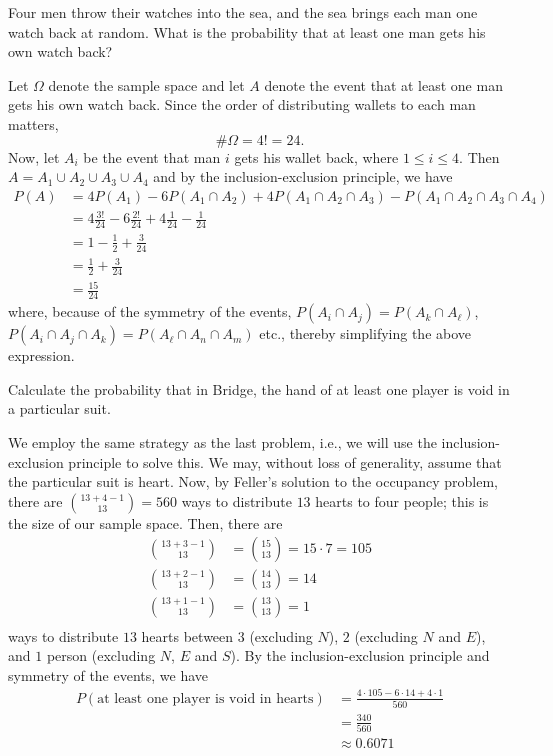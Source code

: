 \begin{problem}[Handout 2, \# 5]
  Four men throw their watches into the sea, and the sea brings each man
  one watch back at random. What is the probability that at least one man
  gets his own watch back?
\end{problem}
\begin{solution}
  Let \(\Omega\) denote the sample space and let \(A\) denote the event
  that at least one man gets his own watch back. Since the order of
  distributing wallets to each man matters,
  \[
    \#\Omega=4!=24.
  \]
  Now, let \(A_i\) be the event that man \(i\) gets his wallet back, where
  \(1\leq i\leq 4\). Then \(A=A_1\cup A_2\cup A_3\cup A_4\) and by the
  inclusion-exclusion principle, we have
  \begin{align*}
    P(A)
    &=4P(A_1)-6P(A_1\cap A_2)+4P(A_1\cap A_2\cap A_3)-P(A_1\cap A_2\cap
      A_3\cap A_4)\\
    &=4\frac{3!}{24}-6\frac{2!}{24}+4\frac{1}{24}-\frac{1}{24}\\
    &=1-\frac{1}{2}+\frac{3}{24}\\
    &=\frac{1}{2}+\frac{3}{24}\\
    &=\frac{15}{24}
  \end{align*}
  where, because of the symmetry of the events,
  \(P(A_i\cap A_j)=P(A_k\cap A_\ell)\),
  \(P(A_i\cap A_j\cap A_k)=P(A_\ell\cap A_n\cap A_m)\) etc., thereby
  simplifying the above expression.
\end{solution}
\newpage

\begin{problem}[Handout 2, \# 7]
  Calculate the probability that in Bridge, the hand of at least one player
  is void in a particular suit.
\end{problem}
\begin{solution}
  We employ the same strategy as the last problem, i.e., we will use the
  inclusion-exclusion principle to solve this. We may, without loss of
  generality, assume that the particular suit is heart. Now, by Feller's
  solution to the occupancy problem, there are
  \(\displaystyle\binom{13+4-1}{13}=560\) ways to distribute \(13\) hearts to
  four people; this is the size of our sample space. Then, there are
  \[
    \begin{aligned}
      \binom{13+3-1}{13}&=\binom{15}{13}=15\cdot 7=105\\
      \binom{13+2-1}{13}&=\binom{14}{13}=14\\
      \binom{13+1-1}{13}&=\binom{13}{13}=1\\
    \end{aligned}
  \]
  ways to distribute \(13\) hearts between \(3\) (excluding \(N\)), \(2\)
  (excluding \(N\) and \(E\)), and \(1\) person (excluding \(N\), \(E\) and
  \(S\)). By the inclusion-exclusion principle and symmetry of the events,
  we have
  \begin{align*}
    P(\text{at least one player is void in hearts})
    &=\frac{4\cdot 105-6\cdot 14+4\cdot 1}{560}\\
    &=\frac{340}{560}\\
    &\approx 0.6071
  \end{align*}
\end{solution}
\newpage

